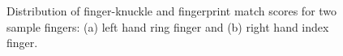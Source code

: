 \begin{figure}[ht]
    \begin{center}
    \end{center}
    \caption{Distribution of finger-knuckle and fingerprint match scores for two sample fingers: (a) left hand ring finger and (b) right hand index finger.}
    \label{score-distribution}
\end{figure}